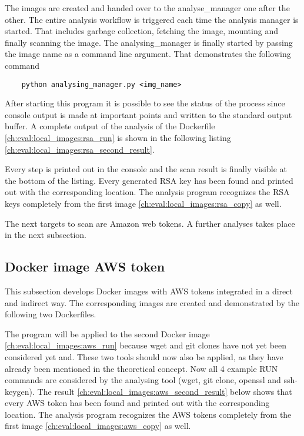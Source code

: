The images are created and handed over to the analyse\_manager one after the other. The entire analysis workflow is triggered each time the analysis manager is started. That includes garbage collection, fetching the image, mounting and finally scanning the image.
The analysing\_manager is finally started by passing the image name as a command line argument. That demonstrates the following command
\begin{lstlisting}
	python analysing_manager.py <img_name>
\end{lstlisting}
After starting this program it is possible to see the status of the process since console output is made at important points and written to the standard output buffer.
A complete output of the analysis of the Dockerfile \ref{ch:eval:local_images:rsa_run} is shown in the following listing \ref{ch:eval:local_images:rsa_second_result}.

Every step is printed out in the console and the scan result is finally visible at the bottom of the listing. Every generated RSA key has been found and printed out with the corresponding location. The analysis program recognizes the RSA keys completely from the first image \ref{ch:eval:local_images:rsa_copy} as well. 

The next targets to scan are Amazon web tokens. A further analyses takes place in the next subsection.

\subsection{Docker image AWS token}
\label{ch:eval:local_images:aws}
This subsection develops Docker images with AWS tokens integrated in a direct and indirect way. The corresponding images are created and demonstrated by the following two Dockerfiles.


The program will be applied to the second Docker image \ref{ch:eval:local_images:aws_run} because wget and git clones have not yet been considered yet and. 
These two tools should now also be applied, as they have already been mentioned in the theoretical concept.
Now all 4 example RUN commands are considered by the analysing tool (wget, git clone, openssl and ssh-keygen). The result \ref{ch:eval:local_images:aws_second_result} below shows that every AWS token has been found and printed out with the corresponding location. The analysis program recognizes the AWS tokens completely from the first image \ref{ch:eval:local_images:aws_copy} as well. 


